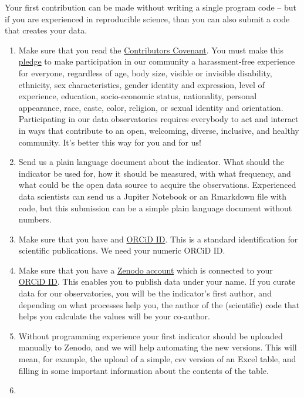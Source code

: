 \documentclass[
  a4paper,
  openany, a4paper, oneside]{book}
\begin{document}
Your first contribution can be made without writing a single program code -- but if you are experienced in reproducible science, than you can also submit a code that creates your data.

\begin{enumerate}
\def\labelenumi{\arabic{enumi}.}
\item
  Make sure that you read the \href{https://www.contributor-covenant.org/}{Contributors Covenant}. You must make this \href{https://www.contributor-covenant.org/version/2/0/code_of_conduct/}{pledge} to make participation in our community a harassment-free experience for everyone, regardless of age, body size, visible or invisible disability, ethnicity, sex characteristics, gender identity and expression, level of experience, education, socio-economic status, nationality, personal appearance, race, caste, color, religion, or sexual identity and orientation. Participating in our data observatories requires everybody to act and interact in ways that contribute to an open, welcoming, diverse, inclusive, and healthy community. It's better this way for you and for us!
\item
  Send us a plain language document about the indicator. What should the indicator be used for, how it should be measured, with what frequency, and what could be the open data source to acquire the observations. Experienced data scientists can send us a Jupiter Notebook or an Rmarkdown file with code, but this submission can be a simple plain language document without numbers.
\item
  Make sure that you have and \href{https://orcid.org/}{ORCiD ID}. This is a standard identification for scientific publications. We need your numeric ORCiD ID.
\item
  Make sure that you have a \href{https://zenodo.org/}{Zenodo account} which is connected to your \href{https://orcid.org/}{ORCiD ID}. This enables you to publish data under your name. If you curate data for our observatories, you will be the indicator's first author, and depending on what processes help you, the author of the (scientific) code that helps you calculate the values will be your co-author.
\item
  Without programming experience your first indicator should be uploaded manually to Zenodo, and we will help automating the new versions. This will mean, for example, the upload of a simple, csv version of an Excel table, and filling in some important information about the contents of the table.
\item

\end{enumerate}
\end{document}
